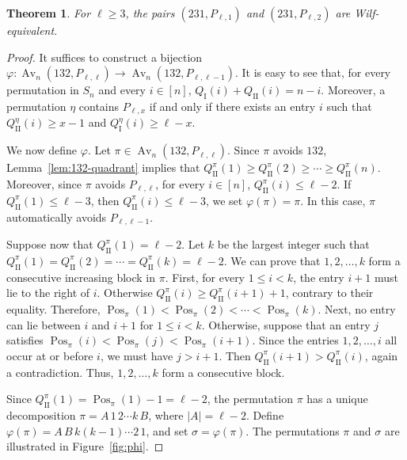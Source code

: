 \documentclass[11pt]{article}
\newtheorem{thm}{Theorem}[section]
\begin{document}
\begin{thm}\label{thm_231_method_1}
For $\ell\geq 3$, the pairs $(231,P_{\ell,1})$ and $(231,P_{\ell,2})$
are Wilf-equivalent.
\end{thm}

\begin{proof}
It suffices to construct a bijection $\varphi:
\operatorname{Av}_n(132,P_{\ell,\ell})
\longrightarrow
\operatorname{Av}_n(132,P_{\ell,\ell-1})$.
It is easy to see that, for every permutation in $S_n$ and every $i\in[n]$, $Q_{\mathrm{I}}(i)+Q_{\mathrm{II}}(i)=n-i$.
Moreover, a permutation $\eta$ contains $P_{\ell,x}$ if and only if there
exists an entry $i$ such that $Q_{\mathrm{II}}^\eta(i)\geq x-1$ and
$Q_{\mathrm{I}}^\eta(i)\geq \ell-x$.

We now define $\varphi$. Let $\pi\in\operatorname{Av}_n(132,P_{\ell,\ell})$.
Since $\pi$ avoids $132$, Lemma~\ref{lem:132-quadrant} implies that
$Q_{\mathrm{II}}^\pi(1)
\geq Q_{\mathrm{II}}^\pi(2)
\geq\cdots\geq Q_{\mathrm{II}}^\pi(n)$.
Moreover, since $\pi$ avoids $P_{\ell,\ell}$, for every $i\in[n]$,
$Q_{\mathrm{II}}^\pi(i)\leq\ell-2$.
If $Q_{\mathrm{II}}^\pi(1)\leq\ell-3$, then $Q_{\mathrm{II}}^\pi(i)\leq\ell-3$,
we set $\varphi(\pi)=\pi$.
In this case, $\pi$ automatically avoids $P_{\ell,\ell-1}$.

Suppose now that $Q_{\mathrm{II}}^\pi(1)=\ell-2$.
Let $k$ be the largest integer such that
$Q_{\mathrm{II}}^\pi(1)
=
Q_{\mathrm{II}}^\pi(2)
=
\cdots
=
Q_{\mathrm{II}}^\pi(k)
=
\ell-2$.
We can prove that $1,2,\ldots,k$ form a consecutive increasing block in
$\pi$.
First, for every $1\leq i<k$, the entry $i+1$ must lie to the right of
$i$. Otherwise $Q_{\mathrm{II}}^\pi(i)
\geq Q_{\mathrm{II}}^\pi(i+1)+1$, contrary to their equality. 
Therefore, $\operatorname{Pos}_{\pi}(1)
<
\operatorname{Pos}_{\pi}(2)
<
\cdots
<
\operatorname{Pos}_{\pi}(k)$.
Next, no entry can lie between $i$ and $i+1$ for
$1\leq i<k$. Otherwise, suppose that an entry $j$ satisfies
$
\operatorname{Pos}_{\pi}(i)
<
\operatorname{Pos}_{\pi}(j)
<
\operatorname{Pos}_{\pi}(i+1)$.
Since the entries $1,2,\ldots,i$ all occur at or before $i$, we must
have $j>i+1$. Then $Q_{\mathrm{II}}^\pi(i+1)
>
Q_{\mathrm{II}}^\pi(i)$,
again a contradiction. 
Thus, $1,2,\ldots,k$ form a consecutive block.

Since $Q_{\mathrm{II}}^\pi(1)=\operatorname{Pos}_{\pi}(1)-1=\ell-2$,
the permutation $\pi$ has a unique decomposition $\pi=A\,1\,2\cdots k\,B$,
where $|A|=\ell-2$. Define $\varphi(\pi)=A\,B\,k(k-1)\cdots2\,1$,
and set $\sigma=\varphi(\pi)$. The permutations $\pi$ and $\sigma$ are
illustrated in Figure~\ref{fig:phi}.


\end{proof}
\end{document}
